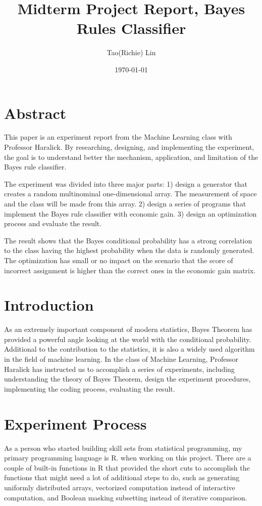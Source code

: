 \documentclass{article}
\title{Midterm Project Report, Bayes Rules Classifier}
\author{Tao(Richie) Lin}
\date{\today}
\begin{document}
    \maketitle
    \begin{multicols}{2}
        \section{Abstract}
        This paper is an experiment report from the Machine Learning class with Professor Haralick. By researching, designing, and implementing the experiment, the goal is to understand better the mechanism, application, and limitation of the Bayes rule classifier.
        
        The experiment was divided into three major parts: 1) design a generator that creates a random multinominal one-dimensional array. The measurement of space and the class will be made from this array. 2) design a series of programs that implement the Bayes rule classifier with economic gain. 3) design an optimization process and evaluate the result.

        The result shows that the Bayes conditional probability has a strong correlation to the class having the highest probability when the data is randomly generated. The optimization has small or no impact on the scenario that the score of incorrect assignment is higher than the correct ones in the economic gain matrix. 
    \section{Introduction}
        As an extremely important component of modern statistics, Bayes Theorem has provided a powerful angle looking at the world with the conditional probability. Additional to the contribution to the statistics, it is also a widely used algorithm in the field of machine learning. In the class of Machine Learning, Professor Haralick has instructed us to accomplish a series of experiments, including understanding the theory of Bayes Theorem, design the experiment procedures, implementing the coding process, evaluating the result.

    \section{Experiment Process}
        As a person who started building skill sets from statistical programming, my primary programming language is R. when working on this project. There are a couple of built-in functions in R that provided the short cuts to accomplish the functions that might need a lot of additional steps to do, such as generating uniformly distributed arrays, vectorized computation instead of interactive computation, and Boolean masking subsetting instead of iterative comparison.


\end{multicols}
\end{document}

